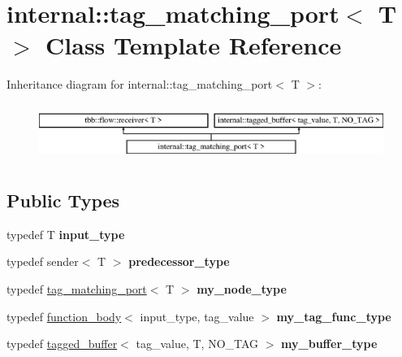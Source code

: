 \hypertarget{classinternal_1_1tag__matching__port}{}\section{internal\+:\+:tag\+\_\+matching\+\_\+port$<$ T $>$ Class Template Reference}
\label{classinternal_1_1tag__matching__port}
Inheritance diagram for internal\+:\+:tag\+\_\+matching\+\_\+port$<$ T $>$\+:\begin{figure}[H]
\begin{center}
\leavevmode
\includegraphics[height=1.854305cm]{classinternal_1_1tag__matching__port}
\end{center}
\end{figure}
\subsection*{Public Types}
\begin{DoxyCompactItemize}
\item 
\hypertarget{classinternal_1_1tag__matching__port_aab94e20dcde2ee794bea53efe590aad7}{}typedef T {\bfseries input\+\_\+type}\label{classinternal_1_1tag__matching__port_aab94e20dcde2ee794bea53efe590aad7}

\item 
\hypertarget{classinternal_1_1tag__matching__port_aac2e8ee247eb905ce0179b3833eec132}{}typedef sender$<$ T $>$ {\bfseries predecessor\+\_\+type}\label{classinternal_1_1tag__matching__port_aac2e8ee247eb905ce0179b3833eec132}

\item 
\hypertarget{classinternal_1_1tag__matching__port_a9aab26c3ce01b12d26bb7aedeb5c6bfd}{}typedef \hyperlink{classinternal_1_1tag__matching__port}{tag\+\_\+matching\+\_\+port}$<$ T $>$ {\bfseries my\+\_\+node\+\_\+type}\label{classinternal_1_1tag__matching__port_a9aab26c3ce01b12d26bb7aedeb5c6bfd}

\item 
\hypertarget{classinternal_1_1tag__matching__port_ad3196a0b80176f665ff8d2e909da5aad}{}typedef \hyperlink{classinternal_1_1function__body}{function\+\_\+body}$<$ input\+\_\+type, tag\+\_\+value $>$ {\bfseries my\+\_\+tag\+\_\+func\+\_\+type}\label{classinternal_1_1tag__matching__port_ad3196a0b80176f665ff8d2e909da5aad}

\item 
\hypertarget{classinternal_1_1tag__matching__port_abd79844bc418b5ab080117b3f5231fff}{}typedef \hyperlink{classinternal_1_1tagged__buffer}{tagged\+\_\+buffer}$<$ tag\+\_\+value, T, N\+O\+\_\+\+T\+A\+G $>$ {\bfseries my\+\_\+buffer\+\_\+type}\label{classinternal_1_1tag__matching__port_abd79844bc418b5ab080117b3f5231fff}

\end{DoxyCompactItemize}
